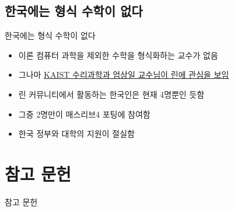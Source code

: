 \documentclass{beamer}
\begin{document}
\subsection{한국에는 형식 수학이 없다}

\begin{frame}{한국에는 형식 수학이 없다}
  \begin{itemize}
    \item 이론 컴퓨터 과학을 제외한 수학을 형식화하는 교수가 없음
    \item 그나마 \href{https://twitter.com/sioum/status/1312178319777959937}{KAIST 수리과학과 엄상일 교수님이 린에 관심을 보임}
    \item 린 커뮤니티에서 활동하는 한국인은 현재 4명뿐인 듯함
    \item 그중 2명만이 매스리브4 포팅에 참여함
    \item 한국 정부와 대학의 지원이 절실함
  \end{itemize}
\end{frame}

\section{참고 문헌}

\begin{frame}{참고 문헌}
  \printbibliography[heading=none]
\end{frame}
\end{document}
